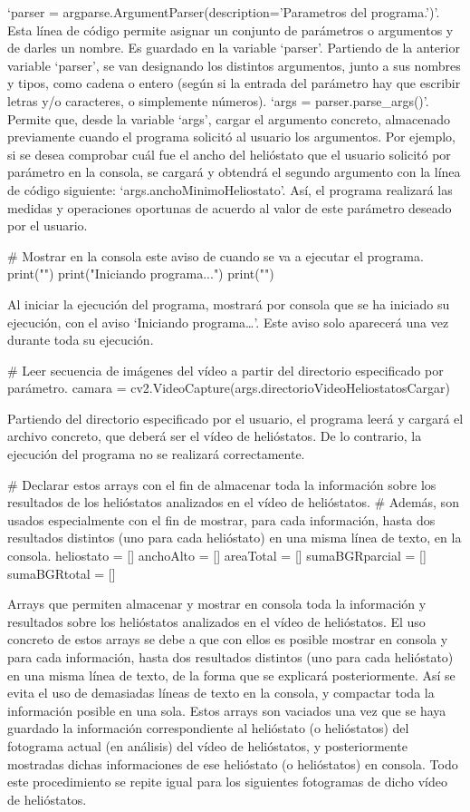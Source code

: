 \documentclass[12pt]{article}
\begin{document}
‘parser = argparse.ArgumentParser(description='Parametros del programa.')’. Esta línea de código permite asignar un conjunto de parámetros o argumentos y de darles un nombre. Es guardado en la variable ‘parser’.
Partiendo de la anterior variable ‘parser’, se van designando los distintos argumentos, junto a sus nombres y tipos, como cadena o entero (según si la entrada del parámetro hay que escribir letras y/o caracteres, o simplemente números).
‘args = parser.parse\_args()’. Permite que, desde la variable ‘args’, cargar el argumento concreto, almacenado previamente cuando el programa solicitó al usuario los argumentos. Por ejemplo, si se desea comprobar cuál fue el ancho del helióstato que el usuario solicitó por parámetro en la consola, se cargará y obtendrá el segundo argumento con la línea de código siguiente: ‘args.anchoMinimoHeliostato’. Así, el programa realizará las medidas y operaciones oportunas de acuerdo al valor de este parámetro deseado por el usuario.


\# Mostrar en la consola este aviso de cuando se va a ejecutar el programa.
print("")
print("Iniciando programa...")
print("")

Al iniciar la ejecución del programa, mostrará por consola que se ha iniciado su ejecución, con el aviso ‘Iniciando programa…’. Este aviso solo aparecerá una vez durante toda su ejecución.


\# Leer secuencia de imágenes del vídeo a partir del directorio especificado por parámetro.
camara = cv2.VideoCapture(args.directorioVideoHeliostatosCargar)

Partiendo del directorio especificado por el usuario, el programa leerá y cargará el archivo concreto, que deberá ser el vídeo de helióstatos. De lo contrario, la ejecución del programa no se realizará correctamente.


\# Declarar estos arrays con el fin de almacenar toda la información sobre los resultados de los helióstatos analizados en el vídeo de helióstatos.
\# Además, son usados especialmente con el fin de mostrar, para cada información, hasta dos resultados distintos (uno para cada helióstato) en una misma línea de texto, en la consola.
heliostato = []
anchoAlto = []
areaTotal = []
sumaBGRparcial = []
sumaBGRtotal = []

Arrays que permiten almacenar y mostrar en consola toda la información y resultados sobre los helióstatos analizados en el vídeo de helióstatos. El uso concreto de estos arrays se debe a que con ellos es posible mostrar en consola y para cada información, hasta dos resultados distintos (uno para cada helióstato) en una misma línea de texto, de la forma que se explicará posteriormente. Así se evita el uso de demasiadas líneas de texto en la consola, y compactar toda la información posible en una sola. Estos arrays son vaciados una vez que se haya guardado la información correspondiente al helióstato (o helióstatos) del fotograma actual (en análisis) del vídeo de helióstatos, y posteriormente mostradas dichas informaciones de ese helióstato (o helióstatos) en consola. Todo este procedimiento se repite igual para los siguientes fotogramas de dicho vídeo de helióstatos.
\end{document}
